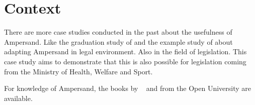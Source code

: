 \section{Context} \label{context}
There are more case studies conducted in the past about the usefulness of Ampersand.
Like the graduation study of  and the example study of  about adapting Ampersand in legal environment.
Also in the field of legislation.
This case study aims to demonstrate that this is also possible for legislation coming from the Ministry of Health, Welfare and Sport.

For knowledge of Ampersand, the books by ~
and  from the Open University are available.










